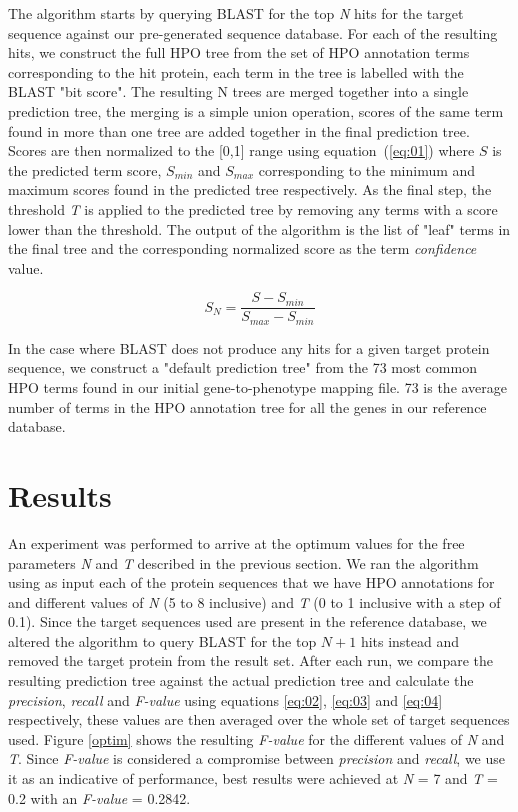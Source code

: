 \documentclass{bioinfo}
\begin{document}
The algorithm starts by querying BLAST for the top \textit{N} hits for the target sequence against our pre-generated sequence database. For each of the resulting hits, we construct the full HPO tree from the set of HPO annotation terms corresponding to the hit protein, each term in the tree is labelled with the BLAST "bit score". The resulting N trees are merged together into a single prediction tree, the merging is a simple union operation, scores of the same term found in more than one tree are added together in the final prediction tree. Scores are then normalized to the [0,1] range using equation~(\ref{eq:01}) where $S$ is the predicted term score, $S_{min}$ and $S_{max}$ corresponding to the minimum and maximum scores found in the predicted tree respectively. As the final step, the threshold \textit{T} is applied to the predicted tree by removing any terms with a score lower than the threshold. The output of the algorithm is the list of "leaf" terms in the final tree and the corresponding normalized score as the term \textit{confidence} value.

\begin{equation}
S_N = \frac{S - S_{min}}{S_{max} - S_{min}}
\label{eq:01}
\end{equation}

In the case where BLAST does not produce any hits for a given target protein sequence, we construct a "default prediction tree" from the 73 most common HPO terms found in our initial gene-to-phenotype mapping file. 73 is the average number of terms in the HPO annotation tree for all the genes in our reference database.

\section{Results}

An experiment was performed to arrive at the optimum values for the free parameters \textit{N} and \textit{T} described in the previous section. We ran the algorithm using as input each of the protein sequences that we have HPO annotations for and different values of \textit{N} (5 to 8 inclusive) and \textit{T} (0 to 1 inclusive with a step of 0.1). Since the target sequences used are present in the reference database, we altered the algorithm to query BLAST for the top $N + 1$ hits instead and removed the target protein from the result set. After each run, we compare the resulting prediction tree against the actual prediction tree and calculate the \textit{precision}, \textit{recall} and \textit{F-value} using equations \ref{eq:02}, \ref{eq:03} and \ref{eq:04} respectively, these values are then averaged over the whole set of target sequences used. Figure \ref{optim} shows the resulting \textit{F-value} for the different values of \textit{N} and \textit{T}. Since \textit{F-value} is considered a compromise between \textit{precision} and \textit{recall}, we use it as an indicative of performance, best results were achieved at \textit{N} = 7 and \textit{T} = 0.2 with an \textit{F-value} = 0.2842.
\end{document}
